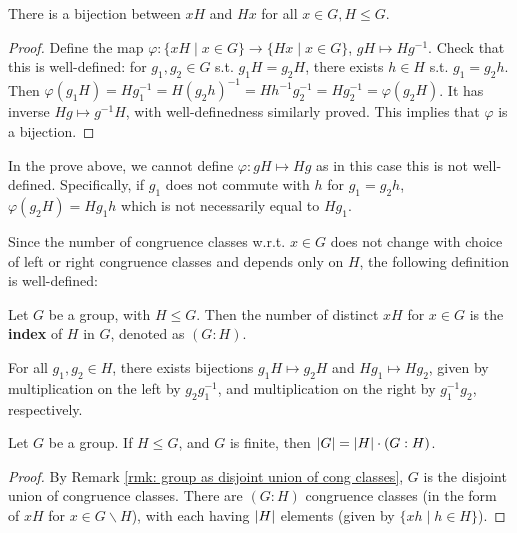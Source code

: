 \documentclass{article}
\begin{document}
\begin{proposition}
    There is a bijection between $xH$ and $Hx$ for all $x \in G, H \leq G$. 
\end{proposition}

\begin{proof}
    Define the map $\varphi: \{xH \mid x \in G\} \to \{Hx \mid x \in G\}$, $gH \mapsto Hg^{-1}$. Check that this is well-defined: for $g_1, g_2 \in G$ s.t. $g_1 H = g_2 H$, there exists $h \in H$ s.t. $g_1 = g_2 h$. Then $\varphi(g_1 H) = Hg_1^{-1} = H(g_2 h)^{-1} = Hh^{-1} g_2^{-1} = Hg_2^{-1} = \varphi(g_2 H)$. It has inverse $Hg \mapsto g^{-1}H$, with well-definedness similarly proved. This implies that $\varphi$ is a bijection.
\end{proof}

\begin{remark}
    In the prove above, we cannot define $\varphi: gH \mapsto Hg$ as in this case this is not well-defined. Specifically, if $g_1$ does not commute with $h$ for $g_1 = g_2 h$, $\varphi(g_2 H) = Hg_1 h$ which is not necessarily equal to $H g_1$.
\end{remark}

Since the number of congruence classes w.r.t. $x \in G$ does not change with choice of left or right congruence classes and depends only on $H$, the following definition is well-defined:

\begin{definition}[Index]
    Let $G$ be a group, with $H \leq G$. Then the number of distinct $xH$ for $x \in G$ is the \textbf{index} of $H$ in $G$, denoted as $(G : H)$.
\end{definition}

\begin{remark}
    For all $g_1, g_2 \in H$, there exists bijections $g_1 H \mapsto g_2 H$ and $H g_1 \mapsto H g_2$, given by multiplication on the left by $g_2 g_1^{-1}$, and multiplication on the right by $g_1^{-1} g_2$, respectively. 
\end{remark}

\begin{theorem}[Lagrange]
    Let $G$ be a group. If $H \leq G$, and $G$ is finite, then $\left|G\right| = \left|H\right| \cdot (G : H)$.
\end{theorem}

\begin{proof}
    By Remark \ref{rmk: group as disjoint union of cong classes}, $G$ is the disjoint union of congruence classes. There are $(G : H)$ congruence classes (in the form of $xH$ for $x \in G \smallsetminus H$), with each having $\left|H\right|$ elements (given by $\{ xh \mid h \in H \}$).
\end{proof}
\end{document}

